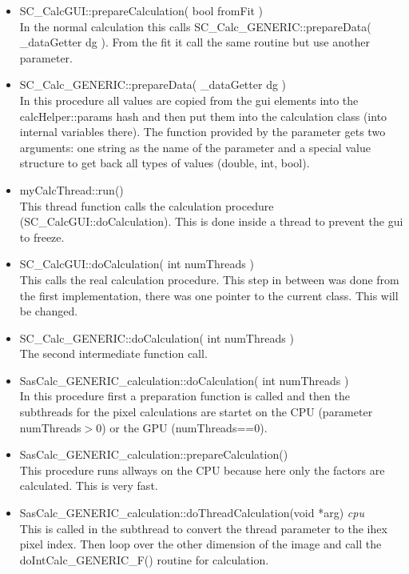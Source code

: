 \documentclass[11pt]{article} %
\begin{document}
\begin{itemize}
\item SC\_CalcGUI::prepareCalculation( bool fromFit ) \\   %
	In the normal calculation this calls SC\_Calc\_GENERIC::prepareData( \_dataGetter dg ). From the fit it call the same routine but use another parameter.

\item SC\_Calc\_GENERIC::prepareData( \_dataGetter dg ) \\
	In this procedure all values are copied from the gui elements into the calcHelper::params hash and then put them into the calculation class (into internal variables there). The function provided by the parameter gets two arguments: one string as the name of the parameter and a special value structure to get back all types of values (double, int, bool).

\item myCalcThread::run() \\
	This thread function calls the calculation procedure (SC\_CalcGUI::doCalculation). This is done inside a thread to prevent the gui to freeze.

\item SC\_CalcGUI::doCalculation( int numThreads ) \\
	This calls the real calculation procedure. This step in between was done from the first implementation, there was one pointer to the current class. This will be changed.

\item SC\_Calc\_GENERIC::doCalculation( int numThreads ) \\
	The second intermediate function call.

\item SasCalc\_GENERIC\_calculation::doCalculation( int numThreads ) \\
	In this procedure first a preparation function is called and then the subthreads for the pixel calculations are startet on the CPU (parameter numThreads$>$0) or the GPU (numThreads==0).

\item SasCalc\_GENERIC\_calculation::prepareCalculation() \\
	This procedure runs allways on the CPU because here only the factors are calculated. This is very fast.

\item SasCalc\_GENERIC\_calculation::doThreadCalculation(void *arg) {\it cpu} \\
	This is called in the subthread to convert the thread parameter to the ihex pixel index. Then loop over the other dimension of the image and call the doIntCalc\_GENERIC\_F() routine for calculation.


\end{itemize}
\end{document}
